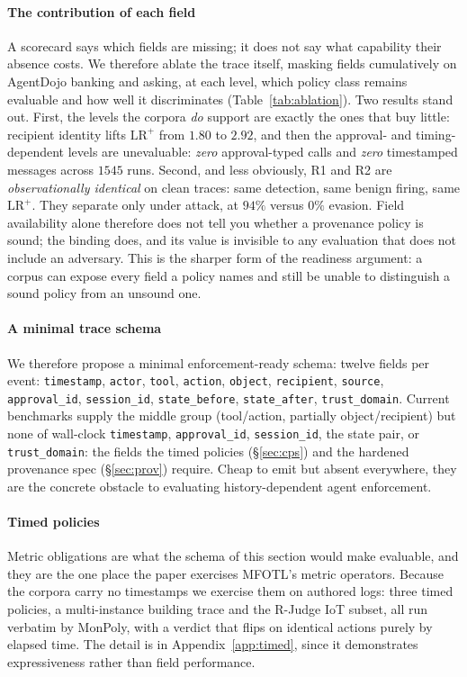 \documentclass[sigconf]{acmart}
\begin{document}
\paragraph{The contribution of each field} A scorecard says which fields are missing; it does not
say what capability their absence costs. We therefore ablate the trace itself, masking
fields cumulatively on AgentDojo banking and asking, at each level, which policy class
remains evaluable and how well it discriminates (Table~\ref{tab:ablation}). Two results
stand out. First, the levels the corpora \emph{do} support are exactly the ones that buy
little: recipient identity lifts $\mathrm{LR^+}$ from $1.80$ to $2.92$, and then the
approval- and timing-dependent levels are unevaluable: \emph{zero}
approval-typed calls and \emph{zero} timestamped messages across $1545$ runs. Second, and
less obviously, R1 and R2 are \emph{observationally identical} on clean traces: same
detection, same benign firing, same $\mathrm{LR^+}$. They separate only under attack, at
$94\%$ versus $0\%$ evasion. Field availability alone therefore does not tell you whether
a provenance policy is sound; the binding does, and its value is invisible to any
evaluation that does not include an adversary. This is the sharper form of the readiness
argument: a corpus can expose every field a policy names and still be unable to
distinguish a sound policy from an unsound one.


\paragraph{A minimal trace schema} We therefore propose a minimal enforcement-ready
schema: twelve fields per event: \texttt{timestamp}, \texttt{actor}, \texttt{tool},
\texttt{action}, \texttt{object}, \texttt{recipient}, \texttt{source},
\texttt{approval\_id}, \texttt{session\_id}, \texttt{state\_before},
\texttt{state\_after}, \texttt{trust\_domain}. Current benchmarks supply the middle
group (tool/action, partially object/recipient) but none of wall-clock
\texttt{timestamp}, \texttt{approval\_id}, \texttt{session\_id}, the state pair, or
\texttt{trust\_domain}: the fields the timed policies (\S\ref{sec:cps}) and the
hardened provenance spec (\S\ref{sec:prov}) require. Cheap to emit but absent
everywhere, they are the concrete obstacle to evaluating history-dependent agent
enforcement.


\paragraph{Timed policies} Metric obligations are what the schema of this section would
make evaluable, and they are the one place the paper exercises MFOTL's metric operators.
Because the corpora carry no timestamps we exercise them on authored logs: three timed
policies, a multi-instance building trace and the R-Judge IoT subset, all run verbatim by
MonPoly, with a verdict that flips on identical actions purely by elapsed time. The
detail is in Appendix~\ref{app:timed}, since it demonstrates expressiveness rather than
field performance.
\end{document}
